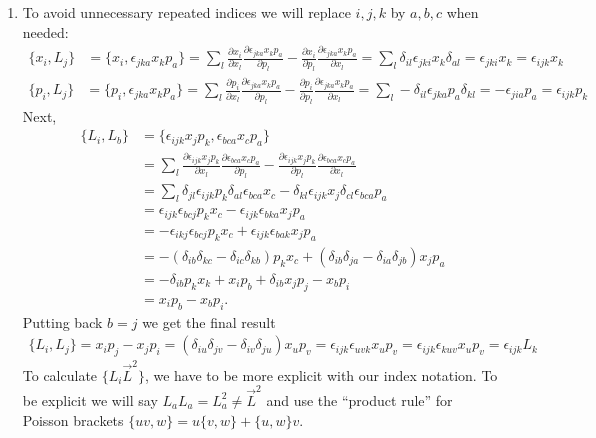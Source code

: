 \documentclass{article}
\theoremstyle{definition}
\newcommand{\p}{\partial}
\newcommand{\f}[2]{\frac{#1}{#2}}
\begin{document}
\begin{enumerate}[label=(\alph*)]
	\item To avoid unnecessary repeated indices we will replace $i,j,k$ by $a,b,c$ when needed: 
	\begin{align*}
	\boxed{\{ x_i, L_j \}} &= \{ x_i , \epsilon_{jka}x_k p_a \} = \sum_{l}\f{\p x_i}{\p x_l}\f{\p \epsilon_{jka}x_k p_a}{\p p_l} - \f{\p x_i}{\p p_l}\f{\p \epsilon_{jka}x_k p_a}{\p x_l}= \sum_l \delta_{il}\epsilon_{jki}x_k\delta_{al} = {\epsilon_{jki}x_k} = \boxed{\epsilon_{ijk}x_k}
	\end{align*}
	\begin{align*}
	\boxed{\{ p_i, L_j \}} &= \{ p_i , \epsilon_{jka}x_k p_a \} 
	= \sum_{l}\f{\p p_i}{\p x_l}\f{\p \epsilon_{jka}x_k p_a}{\p p_l} - \f{\p p_i}{\p p_l}\f{\p \epsilon_{jka}x_k p_a}{\p x_l}
	= \sum_l -\delta_{il}\epsilon_{jka}p_a\delta_{kl}
	= -\epsilon_{jia}p_a    
	=\boxed{\epsilon_{ijk}p_k} 
	\end{align*}
	Next, 
	\begin{align*}
	\{ L_i, L_b \} &= \{ \epsilon_{ijk}x_j p_k , \epsilon_{bca}x_c p_a \} \\
	&= \sum_{l}\f{\p \epsilon_{ijk}x_j p_k}{\p x_l}\f{\p \epsilon_{bca}x_c p_a}{\p p_l} - \f{\p \epsilon_{ijk}x_j p_k}{\p p_l}\f{\p \epsilon_{bca}x_c p_a}{\p x_l}\\
	&= \sum_l \delta_{jl}\epsilon_{ijk}p_k \delta_{al} \epsilon_{bca}x_c - \delta_{kl}\epsilon_{ijk}x_j \delta_{cl}\epsilon_{bca}p_a \\
	&=\epsilon_{ijk}\epsilon_{bcj} p_k x_c - \epsilon_{ijk}\epsilon_{bka} x_j p_a\\
	&=-\epsilon_{ikj}\epsilon_{bcj}p_k x_c + \epsilon_{ijk}\epsilon_{bak}x_j p_a\\
	&=-(\delta_{ib}\delta_{kc} - \delta_{ic}\delta_{kb})p_kx_c + (\delta_{ib}\delta_{ja} - \delta_{ia}\delta_{jb})x_jp_a \\
	&=-\delta_{ib}p_kx_k + x_ip_b + \delta_{ib}x_jp_j - x_bp_i\\
	&= x_ip_b - x_bp_i.
	\end{align*}
	Putting back $b=j$ we get the final result
	\begin{align*}
	\boxed{\{ L_i ,L_j\}} = x_i p_j - x_j p_i = (\delta_{iu}\delta_{jv} - \delta_{iv}\delta_{ju})x_up_v = \epsilon_{ijk}\epsilon_{uvk} x_up_v = \epsilon_{ijk}\epsilon_{kuv}x_up_v = \boxed{\epsilon_{ijk}L_k}
	\end{align*}
	To calculate $\{ L_i \vec{L}^2 \}$, we have to be more explicit with our index notation. To be explicit we will say $L_aL_a = L_a^2 \neq \vec{L}^2$ and use the ``product rule'' for Poisson brackets $\{ uv,w \} = u\{v,w\} + \{u,w\}v $.

\end{enumerate}
\end{document}
